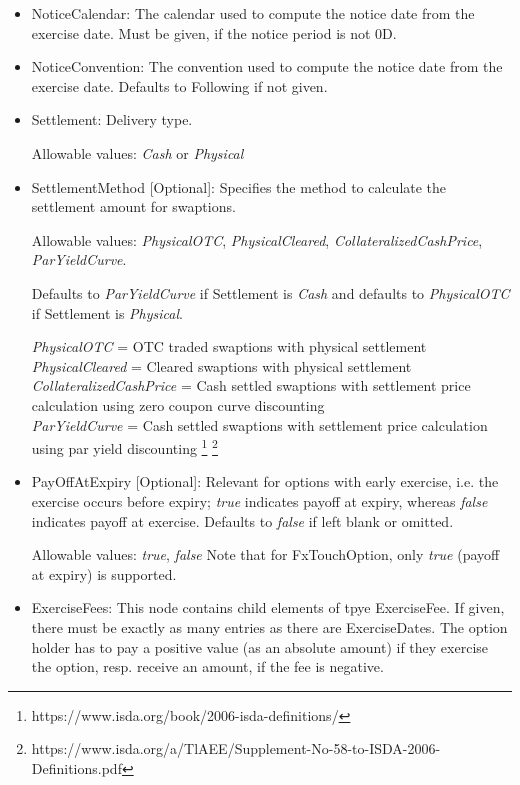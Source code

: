 \begin{itemize}
\item NoticeCalendar: The calendar used to compute the notice date from the exercise date. Must be given, if the notice
  period is not 0D.

\item NoticeConvention: The convention used to compute the notice date from the exercise date. Defaults to Following if
  not given.

\item Settlement: Delivery type. 

  Allowable values: \emph{Cash} or \emph{Physical}

\item SettlementMethod [Optional]: Specifies the method to calculate the settlement amount for swaptions.

  Allowable values: \emph{PhysicalOTC}, \emph{PhysicalCleared}, \emph{CollateralizedCashPrice},\\ \emph{ParYieldCurve}. 
  
  Defaults to \emph{ParYieldCurve} if Settlement is \emph{Cash} and defaults to \emph{PhysicalOTC} if Settlement is \emph{Physical}.

\emph{PhysicalOTC} = OTC traded swaptions with physical settlement\\
\emph{PhysicalCleared} = Cleared swaptions with physical settlement\\
\emph{CollateralizedCashPrice} = Cash settled swaptions with settlement price calculation using zero coupon curve discounting \\
\emph{ParYieldCurve}  = Cash settled swaptions with settlement price calculation using par yield discounting \footnote{https://www.isda.org/book/2006-isda-definitions/} \footnote{https://www.isda.org/a/TlAEE/Supplement-No-58-to-ISDA-2006-Definitions.pdf} \\

\item PayOffAtExpiry [Optional]: Relevant for options with early
  exercise, i.e. the exercise occurs before expiry; \emph{true}
  indicates payoff at expiry, whereas \emph{false}  indicates payoff
  at exercise. Defaults to \emph{false}  if left blank or omitted. 

Allowable values: \emph{true}, \emph{false} Note that for FxTouchOption, only \emph{true} (payoff at expiry) is supported.

\item ExerciseFees: This node contains child elements of tpye ExerciseFee. If given, there must be exactly as many
  entries as there are ExerciseDates. The option holder has to pay a positive value (as an absolute amount) if they
  exercise the option, resp. receive an amount, if the fee is negative.


\end{itemize}
